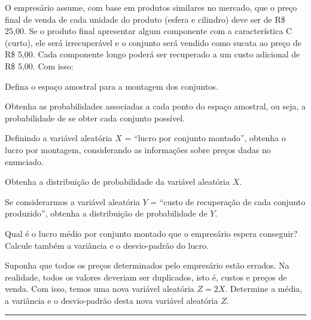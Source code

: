 \documentclass[a4paper,11pt,fleqn]{article}\usepackage[]{graphicx}\usepackage[]{color}
\theoremstyle{definition}
\begin{document}
\begin{compactenum}[1.]
  O empresário assume, com base em produtos similares no mercado, que o
  preço final de venda de cada unidade do produto (esfera e cilindro)
  deve ser de R\$ 25,00. Se o produto final apresentar algum componente
  com a característica C (curto), ele será irrecuperável e o conjunto
  será vendido como sucata ao preço de R\$ 5,00. Cada componente longo
  poderá ser recuperado a um custo adicional de R\$ 5,00. Com isso:
  \begin{compactenum}
  \item Defina o espaço amostral para a montagem dos conjuntos.
  \item Obtenha as probabilidades associadas a cada ponto do espaço
    amostral, ou seja, a probabilidade de se obter cada conjunto
    possível.
  \item Definindo a variável aleatória $X$ = ``lucro por conjunto
    montado'', obtenha o lucro por montagem, considerando as informações
    sobre preços dadas no enunciado.
  \item Obtenha a distribuição de probabilidade da variável aleatória
    $X$.
  \item Se considerarmos a variável aleatória $Y$ = ``custo de
    recuperação de cada conjunto produzido'', obtenha a distribuição de
    probabilidade de $Y$.
  \item Qual é o lucro médio por conjunto montado que o empresário
    espera conseguir? Calcule também a variância e o desvio-padrão do
    lucro.
  \item Suponha que todos os preços determinados pelo empresário estão
    errados. Na realidade, todos os valores deveriam ser duplicados,
    isto é, custos e preços de venda. Com isso, temos uma nova variável
    aleatória $Z = 2X$. Determine a média, a variância e o desvio-padrão
    desta nova variável aleatória $Z$.
  \end{compactenum}


\end{compactenum}

\vspace{0.3cm}
\hrule
\vspace{0.3cm}
\end{document}
